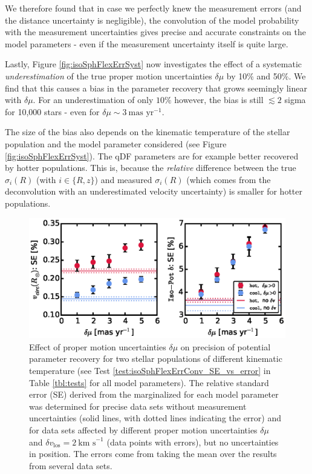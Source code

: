 We therefore found that in case we perfectly knew the measurement errors (and the distance uncertainty is negligible), the convolution of the model probability with the measurement uncertainties gives precise and accurate constraints on the model parameters - even if the measurement uncertainty itself is quite large.

Lastly, Figure \ref{fig:isoSphFlexErrSyst} now investigates the effect of a systematic \emph{underestimation} of the true proper motion uncertainties $\delta \mu$ by 10\% and 50\%. We find that this causes a bias in the parameter recovery that grows seemingly linear with $\delta \mu$. For an underestimation of only $10\%$ however, the bias is still $\lesssim 2$ sigma for 10,000 stars \Wilma{[TO DO: Check]} - even for $\delta \mu \sim 3~\text{mas yr}^{-1}$.

The size of the bias also depends on the kinematic temperature of the stellar population and the model parameter considered (see Figure \ref{fig:isoSphFlexErrSyst}). The qDF parameters are for example better recovered by hotter populations. This is, because the \emph{relative} difference between the true $\sigma_i(R)$ (with $i \in \{R,z\}$) and measured $\sigma_i(R)$ (which comes from the deconvolution with an underestimated velocity uncertainty) is smaller for hotter populations. 


\begin{figure}[!htbp]
\centering
\includegraphics[width=\columnwidth]{figs/isoSphFlexErrConv_SE_vs_error.eps}
\caption{Effect of proper motion uncertainties $\delta \mu$ on precision of potential parameter recovery for two stellar populations of different kinematic temperature (see Test \ref{test:isoSphFlexErrConv_SE_vs_error} in Table \ref{tbl:tests} for all model parameters). The relative standard error (SE) derived from the marginalized \pdf{} for each model parameter was determined for precise data sets without measurement uncertainties (solid lines, with dotted lines indicating the error) and for data sets affected by different proper motion uncertainties $\delta \mu$ and $\delta v_\text{los}=2~\text{km s}^{-1}$ (data points with errors), but no uncertainties in position. The errors come from taking the mean over the results from several data sets.}
\label{fig:isoSphFlexErrConv_SE_vs_error}
\end{figure}


